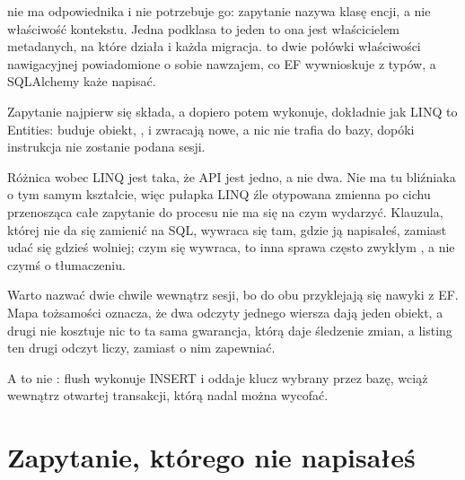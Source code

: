 \begin{csbox}
 nie ma odpowiednika i nie potrzebuje go:
zapytanie nazywa klasę encji, a nie właściwość kontekstu. Jedna podklasa
 to jeden  \dash{} to ona jest
właścicielem metadanych, na które działa  i
każda migracja.  to dwie połówki właściwości
nawigacyjnej powiadomione o sobie nawzajem, co EF wywnioskuje z typów, a
SQLAlchemy każe napisać.
\end{csbox}

Zapytanie najpierw się składa, a dopiero potem wykonuje, dokładnie jak LINQ
to Entities:  buduje obiekt, ,
 i  zwracają nowe, a nic nie trafia do bazy,
dopóki instrukcja nie zostanie podana sesji.


Różnica wobec LINQ jest taka, że API jest jedno, a nie dwa. Nie ma tu
bliźniaka  o tym samym kształcie, więc pułapka LINQ
\dash{} źle otypowana zmienna po cichu przenosząca całe zapytanie do
procesu \dash{} nie ma się na czym wydarzyć. Klauzula, której nie da się
zamienić na SQL, wywraca się tam, gdzie ją napisałeś, zamiast udać się gdzieś
wolniej; czym się wywraca, to inna sprawa \dash{} często zwykłym
, a nie czymś o tłumaczeniu.

Warto nazwać dwie chwile wewnątrz sesji, bo do obu przyklejają się nawyki z
EF. Mapa tożsamości oznacza, że dwa odczyty jednego wiersza dają jeden
obiekt, a drugi nie kosztuje nic \dash{} to ta sama gwarancja, którą daje
śledzenie zmian, a listing ten drugi odczyt liczy, zamiast o nim zapewniać.


A  to nie : flush wykonuje INSERT i oddaje
klucz wybrany przez bazę, wciąż wewnątrz otwartej transakcji, którą nadal
można wycofać.



\section{Zapytanie, którego nie napisałeś}
\label{sec:ch10-expire}

